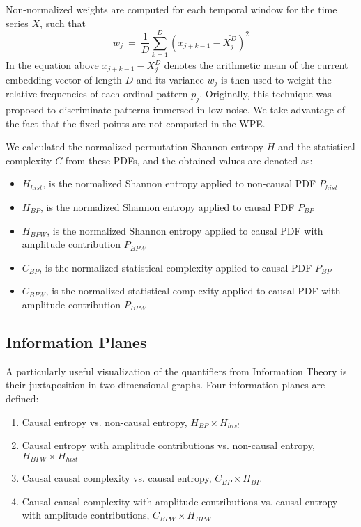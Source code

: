 Non-normalized weights are computed for each temporal window for the time series $X$, such that
\begin{equation}
\label{WPE_weigth}
w_j~=~\frac{1}{D}\sum_{k=1}^{D} \left(x_{j+k-1}-\bar{X_j^D}\right)^2
\end{equation}
In the equation above $x_{j+k-1}-\bar{X_j^D}$ denotes the arithmetic mean of the current embedding vector of length $D$ and its variance $w_j$ is then used to weight the relative frequencies of each ordinal pattern $p_j$.
Originally, this technique was proposed to discriminate patterns immersed in low noise.
We take advantage of the fact that the fixed points are not computed in the WPE.

We calculated the normalized permutation Shannon entropy $H$ and the statistical complexity $C$ from these PDFs, and the obtained values are denoted as:
\begin{itemize}
	\item $H_{hist}$, is the normalized Shannon entropy applied to non-causal PDF $P_{hist}$
	\item $H_{BP}$, is the normalized Shannon entropy applied to causal PDF $P_{BP}$
	\item $H_{BPW}$, is the normalized Shannon entropy applied to causal PDF with amplitude contribution $P_{BPW}$
	\item $C_{BP}$, is the normalized statistical complexity applied to causal PDF $P_{BP}$
	\item $C_{BPW}$, is the normalized statistical complexity applied to causal PDF with amplitude contribution $P_{BPW} $
\end{itemize}

\subsection{Information Planes}

A particularly useful visualization of the quantifiers from Information Theory is their juxtaposition in two-dimensional graphs.
Four information planes are defined:
\begin{enumerate}
	\item Causal entropy vs. non-causal entropy, $H_{BP} \times H_{hist}$
	\item Causal entropy with amplitude contributions vs. non-causal entropy, $H_{BPW} \times H_{hist}$
	\item Causal causal complexity vs. causal entropy, $C_{BP} \times H_{BP}$
	\item Causal causal complexity with amplitude contributions vs. causal entropy with amplitude contributions, $C_{BPW} \times H_{BPW}$
\end{enumerate}

